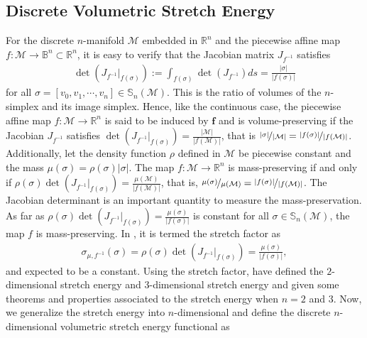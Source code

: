 \documentclass{article}
\begin{document}
\subsection{Discrete Volumetric Stretch Energy}

For the discrete $n$-manifold $\mathcal{M}$ embedded in  $\mathbb{R}^n $ and the piecewise affine map $f:\mathcal{M} \to \mathbb{B}^n \subset \mathbb{R}^n$, it is easy to verify that the Jacobian matrix $J_{f^{-1}}$ satisfies
\begin{align}
    \det\left(J_{f^{-1}}\big|_{f(\sigma)}\right) := \int_{f(\sigma)} \det\left(J_{f^{-1}}\right) ds = \frac{|\sigma|}{|f(\sigma)|}
\end{align}
for all $\sigma = [v_0,v_1,\cdots,v_n] \in \mathbb{S}_n(\mathcal{M})$. This is the ratio of volumes of the $n$-simplex and its image simplex. Hence, like the continuous case, the piecewise affine map $f:\mathcal{M} \to \mathbb{R}^n$ is said to be induced by $\mathbf{f}$ and is volume-preserving if the Jacobian $J_{f^{-1}}$ satisfies $\det\left(J_{f^{-1}}\big|_{f(\sigma)}\right) = \frac{|\mathcal{M}|}{|f(\mathcal{M})|}$, that is $\nicefrac{|\sigma|}{|\mathcal{M}|} = \nicefrac{|f(\sigma)|}{|f(\mathcal{M})|}$.
Additionally, let the density function $\rho$ defined in $\mathcal{M}$ be piecewise constant and the mass $\mu(\sigma) = \rho(\sigma)|\sigma|$. The map $f:\mathcal{M}\to \mathbb{R}^n$ is mass-preserving if and only if $\rho(\sigma)\det\left(J_{f^{-1}}\big|_{f(\sigma)}\right) = \frac{\mu(\mathcal{M})}{|f(\mathcal{M})|}$, that is, $\nicefrac{\mu(\sigma)}{\mu(\mathcal{M})} = \nicefrac{|f(\sigma)|}{|f(\mathcal{M})|}$.
The Jacobian determinant is an important quantity to measure the mass-preservation. As far as $\rho(\sigma)\det\left(J_{f^{-1}}\big|_{f(\sigma)}\right) = \frac{\mu(\sigma)}{|f(\sigma)|}$ is constant for all $\sigma \in \mathbb{S}_n(\mathcal{M})$, the map $f$ is mass-preserving. In \cite{MHWW19,MHTL19,TMWH23}, it is termed the stretch factor as
\begin{align}
    \sigma_{\mu,f^{-1}}(\sigma) = \rho(\sigma)\det\left(J_{f^{-1}}\big|_{f(\sigma)}\right) =  \frac{\mu(\sigma)}{|f(\sigma)|}, \label{eq:stretchfactor}
\end{align}
and expected to be a constant. Using the stretch factor, \cite{MHWW19,MHTL19,TMWH23} have defined the $2$-dimensional stretch energy and $3$-dimensional stretch energy and given some theorems and properties associated to the stretch energy when $n = 2$ and $3$. Now, we generalize the stretch energy into $n$-dimensional and define the discrete $n$-dimensional volumetric stretch energy functional as
\end{document}
